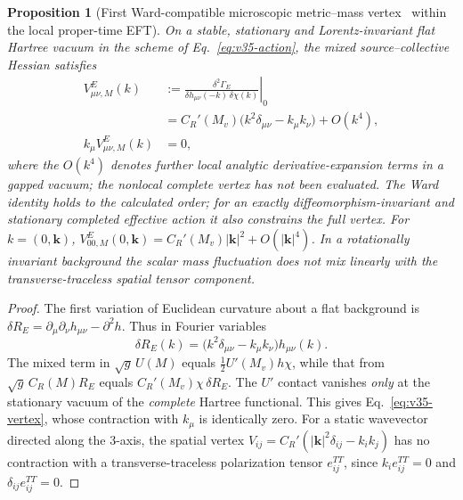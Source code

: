 \documentclass[11pt,a4paper]{article}
\newtheorem{proposition}[theorem]{Proposition}
\theoremstyle{remark}\newtheorem{remark}[theorem]{Remark}
\begin{document}
\begin{proposition}[First Ward-compatible microscopic metric--mass vertex \D\ within the local proper-time EFT]\label{prop:v35-vertex}
On a stable, stationary and Lorentz-invariant flat Hartree vacuum in the scheme of Eq.~\eqref{eq:v35-action}, the mixed source--collective Hessian satisfies
\begin{equation}\label{eq:v35-vertex}
\boxed{\begin{aligned}
V_{\mu\nu,M}^{E}(k)
&:=\left.\frac{\delta^2\Gamma_E}{\delta h_{\mu\nu}(-k)\,\delta\chi(k)}\right|_{0}\\
&=C_R'(M_v)\bigl(k^2\delta_{\mu\nu}-k_\mu k_\nu\bigr)+O(k^4),\\
k_\mu V_{\mu\nu,M}^{E}(k)&=0,
\end{aligned}}
\end{equation}
where the $O(k^4)$ denotes further \emph{local analytic} derivative-expansion terms in a gapped vacuum; the nonlocal complete vertex has not been evaluated. The Ward identity holds to the calculated order; for an exactly diffeomorphism-invariant and stationary completed effective action it also constrains the full vertex. For $k=(0,\bm k)$, $V_{00,M}^E(0,\bm k)=C_R'(M_v)|\bm k|^2+O(|\bm k|^4)$. In a rotationally invariant background the scalar mass fluctuation does not mix linearly with the transverse-traceless spatial tensor component.
\end{proposition}
\begin{proof}
The first variation of Euclidean curvature about a flat background is $\delta R_E=\partial_\mu\partial_\nu h_{\mu\nu}-\partial^2h$. Thus in Fourier variables
\begin{equation}\label{eq:v35-linearR}
\boxed{\delta R_E(k)=\bigl(k^2\delta_{\mu\nu}-k_\mu k_\nu\bigr)h_{\mu\nu}(k).}
\end{equation}
The mixed term in $\sqrt g\,U(M)$ equals $\frac12U'(M_v)h\chi$, while that from $\sqrt g\,C_R(M)R_E$ equals $C_R'(M_v)\chi\,\delta R_E$. The $U'$ contact vanishes \emph{only} at the stationary vacuum of the \emph{complete} Hartree functional. This gives Eq.~\eqref{eq:v35-vertex}, whose contraction with $k_\mu$ is identically zero. For a static wavevector directed along the 3-axis, the spatial vertex $V_{ij}=C_R'(|\bm k|^2\delta_{ij}-k_i k_j)$ has no contraction with a transverse-traceless polarization tensor $e_{ij}^{TT}$, since $k_ie_{ij}^{TT}=0$ and $\delta_{ij}e_{ij}^{TT}=0$. \qedhere
\end{proof}
\end{document}
